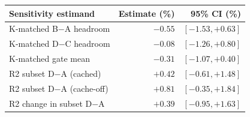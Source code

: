 \begin{tabular}{@{}lrr@{}}
\toprule
Sensitivity estimand & Estimate (\%) & 95\% CI (\%) \\
\midrule
K-matched B$-$A headroom & $-0.55$ & $[-1.53, +0.63]$ \\
K-matched D$-$C headroom & $-0.08$ & $[-1.26, +0.80]$ \\
K-matched gate mean & $-0.31$ & $[-1.07, +0.40]$ \\
\midrule
R2 subset D$-$A (cached) & $+0.42$ & $[-0.61, +1.48]$ \\
R2 subset D$-$A (cache-off) & $+0.81$ & $[-0.35, +1.84]$ \\
R2 change in subset D$-$A & $+0.39$ & $[-0.95, +1.63]$ \\
\bottomrule
\end{tabular}
